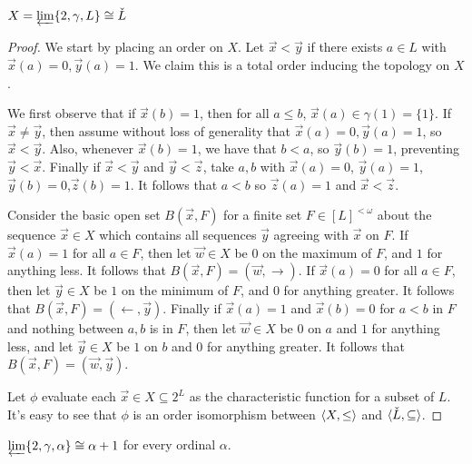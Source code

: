 \documentclass[11pt]{article}
\newcommand{\vect}{\vec}
\begin{document}
  \begin{theorem}
    \(X=\varprojlim \{2, \gamma, L\}\cong \check L\)
  \end{theorem}

  \begin{proof}
    We start by placing an order on \(X\). Let \(\vect x<\vect y\) if
    there exists \(a\in L\) with \(\vect x(a)=0,\vect y(a)=1\). We claim this is
    a total order inducing the topology on \(X\).

    We first observe that if \(\vect x(b)=1\), then for all \(a\leq b\),
    \(\vect x(a)\in\gamma(1)=\{1\}\). If \(\vect x\not=\vect y\), then assume
    without loss of generality that \(\vect x(a)=0,\vect y(a)=1\), so
    \(\vect x<\vect y\). Also, whenever \(\vect x(b)=1\), we have that \(b<a\),
    so \(\vect y(b)=1\), preventing \(\vect y<\vect x\). Finally if
    \(\vect x<\vect y\) and \(\vect y<\vect z\), take \(a,b\) with
    \(\vect x(a)=0\), \(\vect y(a)=1\),\(\vect y(b)=0\),\(\vect z(b)=1\). It
    follows that \(a<b\) so \(\vect z(a)=1\) and \(\vect x<\vect z\).

    Consider the basic open set \(B(\vect x,F)\) for a finite set
    \(F\in [L]^{<\omega}\)
    about the sequence \(\vect x\in X\) which contains all sequences
    \(\vect y\) agreeing with \(\vect x\) on \(F\). If \(\vect x(a)=1\) for all
    \(a\in F\), then let \(\vect w\in X\) be \(0\) on the maximum of \(F\),
    and \(1\) for anything less. It follows that
    \(B(\vect x,F)=(\vect w,\rightarrow)\). If \(\vect x(a)=0\) for all
    \(a\in F\), then let \(\vect y\in X\) be \(1\) on the minimum of \(F\),
    and \(0\) for anything greater. It follows that
    \(B(\vect x,F)=(\leftarrow,\vect y)\). Finally if \(\vect x(a)=1\) and
    \(\vect x(b)=0\) for \(a<b\) in \(F\) and nothing between \(a,b\) is in
    \(F\), then let \(\vect w\in X\) be \(0\) on \(a\)
    and \(1\) for anything less, and let \(\vect y\in X\) be \(1\) on \(b\)
    and \(0\) for anything greater. It follows that
    \(B(\vect x,F)=(\vect w,\vect y)\).

    Let \(\phi\) evaluate each \(\vect x\in X\subseteq 2^L\) as the
    characteristic function for a subset of \(L\). It's easy to see that
    \(\phi\) is an order isomorphism between \(\langle X,\leq\rangle\) and
    \(\langle\check L,\subseteq\rangle\).
  \end{proof}

  \begin{corollary}
    \(
      \varprojlim \{2, \gamma, \alpha\}
      \cong
      \alpha+1
    \)
    for every ordinal \(\alpha\).
  \end{corollary}
\end{document}
